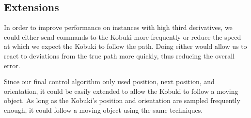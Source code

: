 \documentclass[10pt]{article}
\begin{document}
\begin{multicols*}{2}
  \section*{Extensions}
  In order to improve performance on instances with high third derivatives, we
  could either send commands to the Kobuki more frequently or reduce the speed
  at which we expect the Kobuki to follow the path. Doing either would allow us
  to react to deviations from the true path more quickly, thus reducing the
  overall error.

  Since our final control algorithm only used position, next position, and
  orientation, it could be easily extended to allow the Kobuki to follow a
  moving object. As long as the Kobuki's position and orientation are sampled
  frequently enough, it could follow a moving object using the same techniques.
\end{multicols*}


\end{document}
